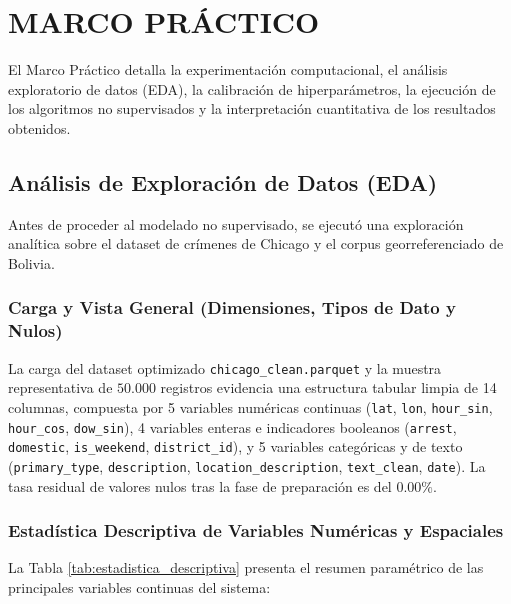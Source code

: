 \section{MARCO PRÁCTICO}

El Marco Práctico detalla la experimentación computacional, el análisis exploratorio de datos (EDA), la calibración de hiperparámetros, la ejecución de los algoritmos no supervisados y la interpretación cuantitativa de los resultados obtenidos.

\subsection{Análisis de Exploración de Datos (EDA)}

Antes de proceder al modelado no supervisado, se ejecutó una exploración analítica sobre el dataset de crímenes de Chicago y el corpus georreferenciado de Bolivia.

\subsubsection{Carga y Vista General (Dimensiones, Tipos de Dato y Nulos)}

La carga del dataset optimizado \texttt{chicago\_clean.parquet} y la muestra representativa de $50.000$ registros evidencia una estructura tabular limpia de 14 columnas, compuesta por 5 variables numéricas continuas (\texttt{lat}, \texttt{lon}, \texttt{hour\_sin}, \texttt{hour\_cos}, \texttt{dow\_sin}), 4 variables enteras e indicadores booleanos (\texttt{arrest}, \texttt{domestic}, \texttt{is\_weekend}, \texttt{district\_id}), y 5 variables categóricas y de texto (\texttt{primary\_type}, \texttt{description}, \texttt{location\_description}, \texttt{text\_clean}, \texttt{date}). La tasa residual de valores nulos tras la fase de preparación es del $0.00\%$.

\subsubsection{Estadística Descriptiva de Variables Numéricas y Espaciales}

La Tabla \ref{tab:estadistica_descriptiva} presenta el resumen paramétrico de las principales variables continuas del sistema:

